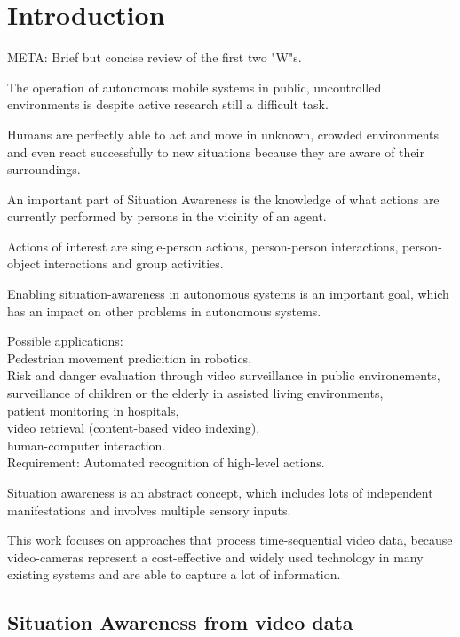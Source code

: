 \section{Introduction}
META: Brief but concise review of the first two "W"s.

The operation of autonomous mobile systems in public, uncontrolled environments is despite active research still a difficult task.

Humans are perfectly able to act and move in unknown, crowded environments and even react successfully to new situations because they are aware of their surroundings.

An important part of Situation Awareness is the knowledge of what actions are currently performed by persons in the vicinity of an agent.

Actions of interest are single-person actions, person-person interactions, person-object interactions and group activities.

Enabling situation-awareness in autonomous systems is an important goal, which has an impact on other problems in autonomous systems.

Possible applications:\\
Pedestrian movement predicition in robotics,\\
Risk and danger evaluation through video surveillance in public environements,\\
surveillance of children or the elderly in assisted living environments,\\
patient monitoring in hospitals,\\
video retrieval (content-based video indexing),\\
human-computer interaction.\\

Requirement: Automated recognition of high-level actions.

Situation awareness is an abstract concept, which includes lots of independent manifestations and involves multiple sensory inputs.

This work focuses on approaches that process time-sequential video data, because video-cameras represent a cost-effective and widely used technology in many existing systems and are able to capture a lot of information.

\subsection{Situation Awareness from video data}

